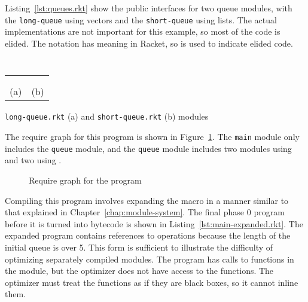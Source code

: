 Listing~\ref{lst:queues.rkt} show the public interfaces for two queue modules, with the \texttt{long-queue} using vectors and the \texttt{short-queue} using lists. 
The actual implementations are not important for this example, so most of the code is elided.
The  notation has meaning in Racket, so \racket{---} is used to indicate elided code.


\newsavebox{\longqueue}
\begin{lrbox}{\longqueue}
  \begin{minipage}{.5\textwidth}
    \centering
  \inputminted{racket}{listings/long-queue.rkt} 
\end{minipage}
\end{lrbox}

\newsavebox{\shortqueue}
\begin{lrbox}{\shortqueue}
  \begin{minipage}{.5\textwidth}
    \centering
  \inputminted{racket}{listings/short-queue.rkt} 
\end{minipage}
\end{lrbox}

\begin{listing}
  \begin{tabular}{c c}
    \usebox{\longqueue}
    &
    \usebox{\shortqueue}
    \\
    \rule{0pt}{1em} \\
    (a) & (b)
  \end{tabular}
  \caption{\texttt{long-queue.rkt} (a) and \texttt{short-queue.rkt} (b) modules}
  \label{lst:queues.rkt}
\end{listing}


The require graph for this program is shown in Figure~\ref{fig:queue-modules.tex}.
The \texttt{main} module only includes the \texttt{queue} module, and the \texttt{queue} module includes two modules using  and two using .

\begin{figure}
  
  \caption{Require graph for the  program}
  \label{fig:queue-modules.tex}
\end{figure}

Compiling this program involves expanding the  macro in a manner similar to that explained in Chapter~\ref{chap:module-system}. The final phase 0 program before it is turned into bytecode is shown in Listing~\ref{lst:main-expanded.rkt}.
The expanded program contains references to  operations because the length of the initial queue is over 5.
This form is sufficient to illustrate the difficulty of optimizing separately compiled modules.
The program has calls to functions in the  module, but the optimizer does not have access to the functions.
The optimizer must treat the functions as if they are black boxes, so it cannot inline them.

